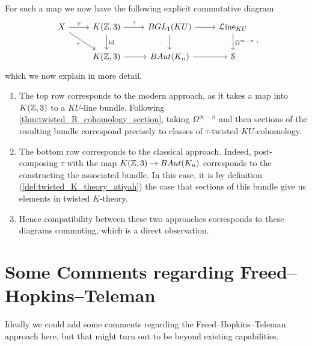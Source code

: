 \documentclass[10pt]{amsart}
\begin{document}
For such a map we now have the following explicit commutative diagram 
\[ 
\begin{tikzcd}
 X \arrow[dr, "\tau"'] \arrow[r, "\tau"] & {K(\bZ,3)} \arrow[r, "?"] \arrow[d, "\mathrm{id}"] & BGL_1(KU) \arrow[r] \arrow[d] & \Line_{KU} \arrow[d, "\Omega^{\infty - n}"] \\
 & {K(\bZ,3)} \arrow[r] & BAut(K_n) \arrow[r] & \lS
\end{tikzcd},
\]
which we now explain in more detail. 
\begin{enumerate}
	\item The top row corresponds to the modern approach, as it takes a map into $K(\mathbb{Z},3)$ to a $KU$-line bundle. Following \cref{thm:twisted_R_cohomology_section}, taking $\Omega^{\infty - n}$ and then sections of the resulting bundle correspond precisely to classes of $\tau$-twisted $KU$-cohomology.
	\item The bottom row corresponds to the classical approach. Indeed, post-composing $\tau$ with the map $K(\mathbb{Z},3) \to BAut(K_n)$ corresponds to the constructing the associated bundle. In this case, it is by definition (\cref{def:twisted_K_theory_atiyah}) the case that sections of this bundle give us elements in twisted $K$-theory. 
	\item Hence compatibility between these two approaches corresponds to these diagrams commuting, which is a direct observation.
\end{enumerate}





\section{Some Comments regarding Freed--Hopkins--Teleman}
Ideally we could add some comments regarding the Freed--Hopkins--Teleman approach here, but that might turn out to be beyond existing capabilities.

{\footnotesize
 
 
 }
\end{document}
